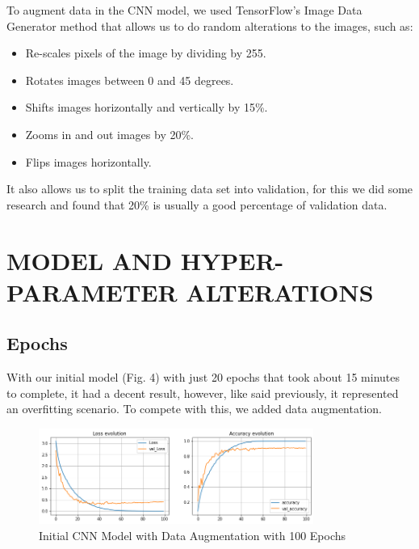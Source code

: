 \documentclass[conference]{IEEEtran}
\begin{document}
To augment data in the CNN model, we used TensorFlow's Image Data Generator method that allows us to do random alterations to the images, such as:

\begin{itemize}
\item Re-scales pixels of the image by dividing by 255.
\item Rotates images between 0 and 45 degrees.
\item Shifts images horizontally and vertically by 15\%.
\item Zooms in and out images by 20\%.
\item Flips images horizontally.
\end{itemize}

It also allows us to split the training data set into validation, for this we did some research and found that 20\% is usually a good percentage of validation data.

\section{MODEL AND HYPER-PARAMETER ALTERATIONS}

\subsection{Epochs}

With our initial model (Fig. 4) with just 20 epochs that took about 15 minutes to complete, it had a decent result, however, like said previously, it represented an overfitting scenario. To compete with this, we added data augmentation.

\begin{figure}[htbp]
    \centerline{\includegraphics[width=9cm]{img/initial_model_100ep.png}}
    \caption{Initial CNN Model with Data Augmentation with 100 Epochs}
    \label{fig:hist_train_classes}
\end{figure}
\end{document}
